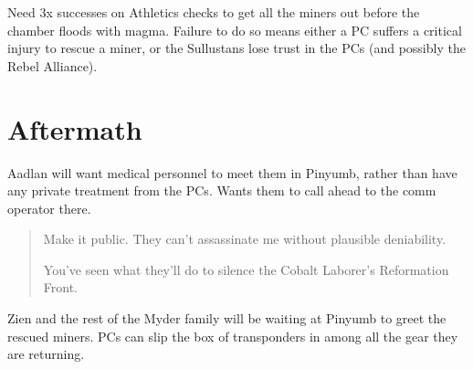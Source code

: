 \documentclass{book}
\newcommand{\df}{\difficulty}
\begin{document}
\begin{multicols}{2}
Need 3x successes on \df\df\df Athletics checks to get all the miners out before the chamber floods with magma.  Failure to do so means either a PC suffers a critical injury to rescue a miner, or the Sullustans lose trust in the PCs (and possibly the Rebel Alliance).

\section{Aftermath}

Aadlan will want medical personnel to meet them in Pinyumb, rather than have any private treatment from the PCs. Wants them to call ahead to the comm operator there.
\begin{quote}
Make it public. They can’t assassinate me without plausible deniability.

You’ve seen what they’ll do to silence the Cobalt Laborer’s Reformation Front.
\end{quote}

Zien and the rest of the Myder family will be waiting at Pinyumb to greet the rescued miners. PCs can slip the box of transponders in among all the gear they are returning.

\end{multicols}
\end{document}
